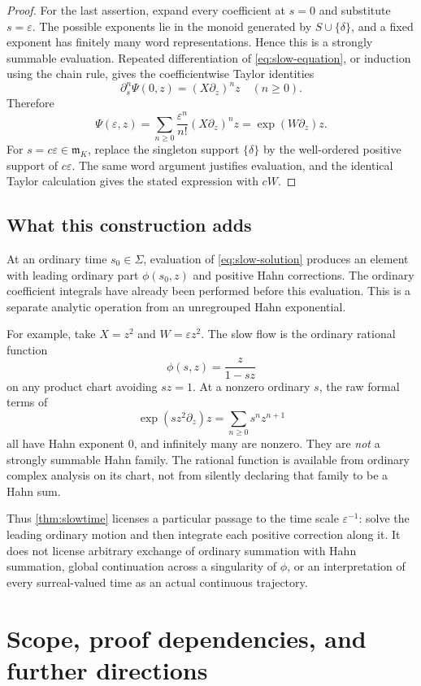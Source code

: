 \documentclass[11pt,a4paper]{article}
\numberwithin{equation}{section}
\theoremstyle{definition}
\theoremstyle{remark}
\newcommand{\mm}{\mathfrak m}
\newcommand{\eps}{\varepsilon}
\begin{document}
\begin{proof}
For the last assertion, expand every coefficient at $s=0$ and substitute
$s=\eps$.  The possible exponents lie in the monoid generated by
$S\cup\{\delta\}$, and a fixed exponent has finitely many word
representations.  Hence this is a strongly summable evaluation.  Repeated
differentiation of \eqref{eq:slow-equation}, or induction using the chain
rule, gives the coefficientwise Taylor identities
\[
 \partial_s^n\Psi(0,z)=(X\partial_z)^n z\quad(n\geq0).
\]
Therefore
\[
 \Psi(\eps,z)=\sum_{n\geq0}\frac{\eps^n}{n!}
                       (X\partial_z)^n z
             =\exp(W\partial_z)z.
\]
For $s=c\eps\in\mm_K$, replace the singleton support $\{\delta\}$
by the well-ordered positive support of $c\eps$.  The same word argument
justifies evaluation, and the identical Taylor calculation gives the
stated expression with $cW$.
\end{proof}

\subsection{What this construction adds}

At an ordinary time $s_0\in\Sigma$, evaluation of
\eqref{eq:slow-solution} produces an element with leading ordinary part
$\phi(s_0,z)$ and positive Hahn corrections.  The ordinary coefficient
integrals have already been performed before this evaluation.  This is a
separate analytic operation from an unregrouped Hahn exponential.

For example, take $X=z^2$ and $W=\eps z^2$.  The slow flow is the ordinary
rational function
\[
 \phi(s,z)=\frac{z}{1-sz}
\]
on any product chart avoiding $sz=1$.  At a nonzero ordinary $s$, the raw
formal terms of
\[
 \exp(s z^2\partial_z)z=\sum_{n\geq0}s^n z^{n+1}
\]
all have Hahn exponent $0$, and infinitely many are nonzero.  They are
\emph{not} a strongly summable Hahn family.  The rational function is
available from ordinary complex analysis on its chart, not from silently
declaring that family to be a Hahn sum.

Thus \cref{thm:slowtime} licenses a particular passage to the time scale
$\eps^{-1}$: solve the leading ordinary motion and then integrate each
positive correction along it.  It does not license arbitrary exchange of
ordinary summation with Hahn summation, global continuation across a
singularity of $\phi$, or an interpretation of every surreal-valued time
as an actual continuous trajectory.

\section{Scope, proof dependencies, and further directions}
\label{sec:scope}
\end{document}
